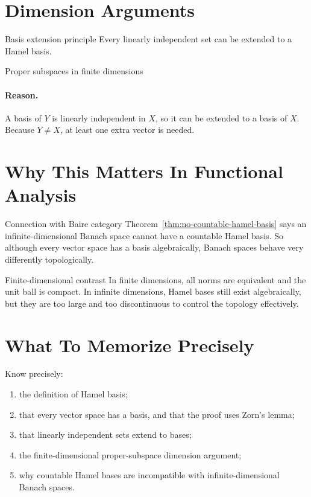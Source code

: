 \documentclass[11pt]{article}
\begin{document}
\section{Dimension Arguments}

\begin{thmbox}{Basis extension principle}
Every linearly independent set can be extended to a Hamel basis.
\end{thmbox}

\begin{thmbox}{Proper subspaces in finite dimensions}
\thmProperSubspace
\end{thmbox}

\paragraph{Reason.}
A basis of $Y$ is linearly independent in $X$, so it can be extended to a basis of $X$. Because $Y\neq X$, at least one extra vector is needed.

\section{Why This Matters In Functional Analysis}

\begin{exbox}{Connection with Baire category}
Theorem~\ref{thm:no-countable-hamel-basis} says an infinite-dimensional Banach space cannot have a countable Hamel basis. So although every vector space has a basis algebraically, Banach spaces behave very differently topologically.
\end{exbox}

\begin{exbox}{Finite-dimensional contrast}
In finite dimensions, all norms are equivalent and the unit ball is compact. In infinite dimensions, Hamel bases still exist algebraically, but they are too large and too discontinuous to control the topology effectively.
\end{exbox}

\section{What To Memorize Precisely}

\begin{focusbox}
Know precisely:
\begin{enumerate}
\item the definition of Hamel basis;
\item that every vector space has a basis, and that the proof uses Zorn's lemma;
\item that linearly independent sets extend to bases;
\item the finite-dimensional proper-subspace dimension argument;
\item why countable Hamel bases are incompatible with infinite-dimensional Banach spaces.
\end{enumerate}
\end{focusbox}
\end{document}
